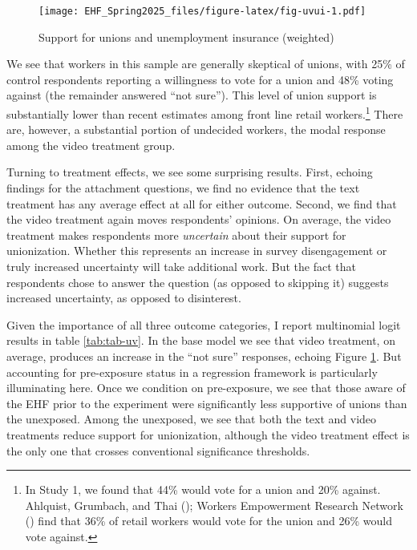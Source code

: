 \documentclass[
  11pt,
  oneside]{article}
\begin{document}
\begin{figure}
\centering
\texttt{[image: EHF\_Spring2025\_files/figure-latex/fig-uvui-1.pdf]}
\caption{\label{fig:fig-uvui}Support for unions and unemployment insurance (weighted)}
\end{figure}

We see that workers in this sample are generally skeptical of unions, with 25\% of control respondents reporting a willingness to vote for a union and 48\% voting against (the remainder answered ``not sure''). This level of union support is substantially lower than recent estimates among front line retail workers.\footnote{In Study 1, we found that 44\% would vote for a union and 20\% against. Ahlquist, Grumbach, and Thai (); Workers Empowerment Research Network () find that 36\% of retail workers would vote for the union and 26\% would vote against.} There are, however, a substantial portion of undecided workers, the modal response among the video treatment group.

Turning to treatment effects, we see some surprising results. First, echoing findings for the attachment questions, we find no evidence that the text treatment has any average effect at all for either outcome. Second, we find that the video treatment again moves respondents' opinions. On average, the video treatment makes respondents more \emph{uncertain} about their support for unionization. Whether this represents an increase in survey disengagement or truly increased uncertainty will take additional work. But the fact that respondents chose to answer the question (as opposed to skipping it) suggests increased uncertainty, as opposed to disinterest.

Given the importance of all three outcome categories, I report multinomial logit results in table \ref{tab:tab-uv}. In the base model we see that video treatment, on average, produces an increase in the ``not sure'' responses, echoing Figure \ref{fig:fig-uvui}. But accounting for pre-exposure status in a regression framework is particularly illuminating here. Once we condition on pre-exposure, we see that those aware of the EHF prior to the experiment were significantly less supportive of unions than the unexposed. Among the unexposed, we see that both the text and video treatments reduce support for unionization, although the video treatment effect is the only one that crosses conventional significance thresholds.
\end{document}
